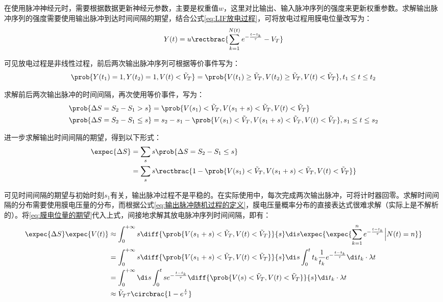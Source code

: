 \documentclass[11pt]{article}
\begin{document}
在使用脉冲神经元时，需要根据数据更新神经元参数，主要是权重值$w$，这里对比输出、输入脉冲序列的强度来更新权重参数。求解输出脉冲序列的强度需要使用输出脉冲到达时间间隔的期望，结合公式\ref{eq:LIF放电过程}，可将放电过程用膜电位量改写为：
\begin{align}
  Y(t)=u\rectbrac{\sum_{k=1}^{N(t)}e^{-\frac{t-t_k}{\tau}}-V_T}
  \label{eq:输出脉冲随机过程的定义}
\end{align}\par
可见放电过程是非线性过程，前后两次输出脉冲序列可根据等价事件写为：
\begin{align*}
   \prob{Y(t_1)=1,Y(t_2)=1,V(t)<\tilde{V}_T}=\prob{V(t_1)\ge \tilde{V}_T,V(t_2)\ge \tilde{V}_T,V(t)<\tilde{V}_T},t_1\le t\le t_2
\end{align*}\par
求解前后两次输出脉冲的时间间隔，再次使用等价事件，写为：
\begin{align*}
  \prob{\Delta S=S_2-S_1>s}&=\prob{V(s_1)< \tilde{V}_T , V(s_1+s)< \tilde{V}_T,V(t)<\tilde{V}_T}\\
  \prob{\Delta S=S_2-S_1\le s}&=s_2-s_1-\prob{V(s_1)< \tilde{V}_T , V(s_1+s)< \tilde{V}_T,V(t)<\tilde{V}_T},s_1\le t\le s_2
\end{align*}\par
进一步求解输出时间间隔的期望，得到以下形式：
\begin{align*}
  \expec{\Delta S}&=\sum_{s}s\prob{\Delta S=S_2-S_1\le s}\\
&=\sum_{s}s\rectbrac{1-\prob{V(s_1)< \tilde{V}_T , V(s_1+s)< \tilde{V}_T,V(t)<\tilde{V}_T}}
\end{align*}\par
可见时间间隔的期望与初始时刻$s_1$有关，输出脉冲过程不是平稳的。在实际使用中，每次完成两次输出脉冲，可将计时器回零。求解时间间隔的分布需要使用膜电压量的分布，而根据公式\ref{eq:输出脉冲随机过程的定义}，膜电压量概率分布的直接表达式很难求解（实际上是不解析的）。将\ref{eq:膜电位量的期望}代入上式，间接地求解其放电脉冲序列时间间隔，即有：
\begin{align*}
  \expec{\Delta S}\expec{V(t)}&\approx\int_{0}^{+\infty}s\diff{\prob{V(s_1+s)< \tilde{V}_T,V(t)<\tilde{V}_T}}{s}\di s\expec{\expec{\sum_{k=1}^{n}e^{-\frac{t-t_k}{\tau}}\Big|N(t)=n}}\\
  &=\int_{0}^{+\infty}s\diff{\prob{V(s_1+s)< \tilde{V}_T,V(t)<\tilde{V}_T}}{s}\di s\int_{0}^{t}t_k\frac{1}{t_k}e^{-\frac{t-t_k}{\tau}}\di t_k\cdot \lambda t\\
  &=\int_{0}^{+\infty}\di s\int_{0}^{t} se^{-\frac{t-t_k}{\tau}}\diff{\prob{V(s)< \tilde{V}_T,V(t)<\tilde{V}_T}}{s}\di t_k\cdot \lambda t\\
  &\approx \tilde{V}_T\tau\circbrac{1-e^\frac{t}{\tau}}
\end{align*}\par
\end{document}
